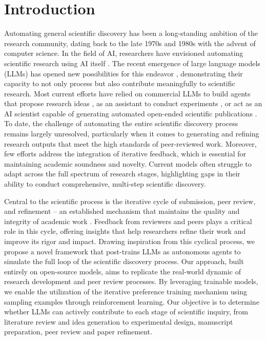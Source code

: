 \documentclass{article} %
\begin{document}
\section{Introduction}


Automating general scientific discovery has been a long-standing ambition of the research community, dating back to the late 1970s and 1980s \citep{lenat1977automated, lenat1983eurisko, langley1987scientific} with the advent of computer science. In the field of AI, researchers have envisioned automating scientific research using AI itself \citep{hutter2001towards,radensky2024scideator}. The recent emergence of large language models (LLMs) has opened new possibilities for this endeavor \citep{wang2023scientific,lu2024ai}, demonstrating their capacity to not only process but also contribute meaningfully to scientific research. Most current efforts have relied on commercial LLMs to build agents that propose research ideas \citep{wang2023scimon,yang2023large,radensky2024scideator,baek2024researchagent,liu2024towards}, as an assistant to conduct experiments \citep{du2024llms,yang2024collaborative,li2024mlrcopilotautonomousmachinelearning}, or act as an AI scientist capable of generating automated open-ended scientific publications \citep{lu2024ai,taniguchi2024collectivepredictivecodingmodel}. 
To date, the challenge of automating the entire scientific discovery process remains largely unresolved, particularly when it comes to generating and refining research outputs that meet the high standards of peer-reviewed work. Moreover, few efforts address the integration of iterative feedback, which is essential for maintaining academic soundness and novelty. Current models often struggle to adapt across the full spectrum of research stages, highlighting gaps in their ability to conduct comprehensive, multi-step scientific discovery.

Central to the scientific process is the iterative cycle of submission, peer review, and refinement -- an established mechanism that maintains the quality and integrity of academic work \citep{smith2006peer,boughton2018research}. Feedback from reviewers and peers plays a critical role in this cycle, offering insights that help researchers refine their work and improve its rigor and impact. Drawing inspiration from this cyclical process, we propose a novel framework that post-trains LLMs as autonomous agents to simulate the full loop of the scientific discovery process. Our approach, built entirely on open-source models, aims to replicate the real-world dynamic of research development and peer review processes. By leveraging trainable models, we enable the utilization of the iterative preference training mechanism \citep{yuan2024self} using sampling examples through reinforcement learning. Our objective is to determine whether LLMs can actively contribute to each stage of scientific inquiry, from literature review and idea generation to experimental design, manuscript preparation, peer review and paper refinement.
\end{document}

